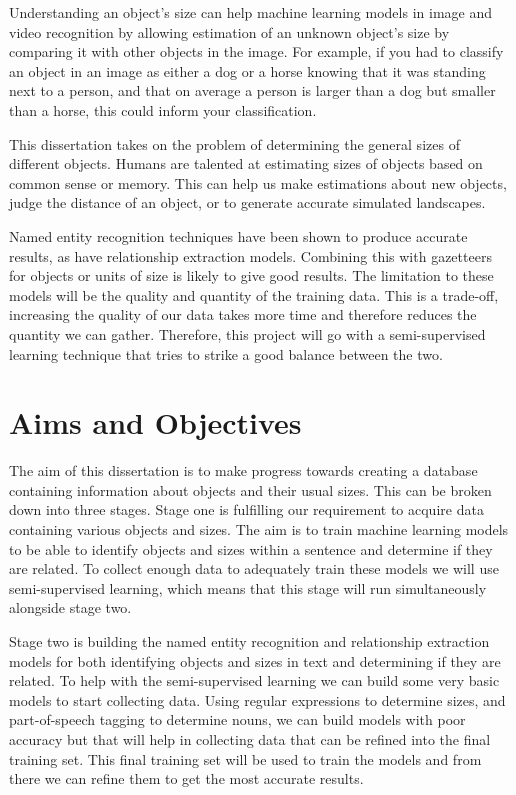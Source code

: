 \documentclass[11pt,oneside]{book}
\begin{document}
Understanding an object's size can help machine learning models in image and video recognition by allowing estimation of an unknown object's size by comparing it with other objects in the image. For example, if you had to classify an object in an image as either a dog or a horse knowing that it was standing next to a person, and that on average a person is larger than a dog but smaller than a horse, this could inform your classification.

This dissertation takes on the problem of determining the general sizes of different objects. Humans are talented at estimating sizes of objects based on common sense or memory. This can help us make estimations about new objects, judge the distance of an object, or to generate accurate simulated landscapes.

Named entity recognition techniques have been shown to produce accurate results, as have relationship extraction models. Combining this with gazetteers for objects or units of size is likely to give good results. The limitation to these models will be the quality and quantity of the training data. This is a trade-off, increasing the quality of our data takes more time and therefore reduces the quantity we can gather. Therefore, this project will go with a semi-supervised learning technique that tries to strike a good balance between the two.

\section{Aims and Objectives}

The aim of this dissertation is to make progress towards creating a database containing information about objects and their usual sizes. This can be broken down into three stages. Stage one is fulfilling our requirement to acquire data containing various objects and sizes. The aim is to train machine learning models to be able to identify objects and sizes within a sentence and determine if they are related. To collect enough data to adequately train these models we will use semi-supervised learning, which means that this stage will run simultaneously alongside stage two.

Stage two is building the named entity recognition and relationship extraction models for both identifying objects and sizes in text and determining if they are related. To help with the semi-supervised learning we can build some very basic models to start collecting data. Using regular expressions to determine sizes, and part-of-speech tagging to determine nouns, we can build models with poor accuracy but that will help in collecting data that can be refined into the final training set. This final training set will be used to train the models and from there we can refine them to get the most accurate results.
\end{document}
